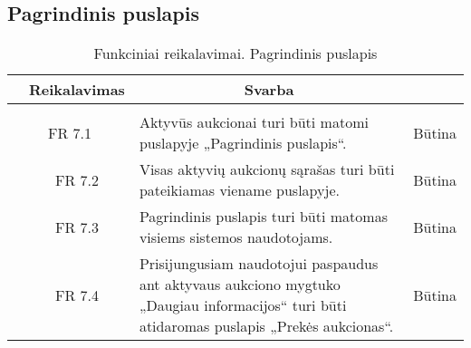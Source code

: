 \documentclass{VUMIFPSkursinis}
\begin{document}
\subsection{Pagrindinis puslapis}
\begin{table}[H]
	\caption{Funkciniai reikalavimai. Pagrindinis puslapis}
	\begin{tabular}{|p{1cm}|p{1cm}|p{}|p{}|}
		\hline 
		\rowcolor{gray!50}
		\multicolumn{2}{|c|}{{\bfseries Kodas}}&
		\multicolumn{1}{c|}{{\bfseries Reikalavimas}}&
		\multicolumn{1}{c|}{{\bfseries Svarba}}\\
		\hline
		\rowcolor{lightgray}
		\multicolumn{4}{|c|}{Pagrindinis puslapis}\\		
		
		\hline
		\multicolumn{2}{|c|}{FR 7.1}&
		{Aktyvūs aukcionai turi būti matomi puslapyje „Pagrindinis puslapis“.
		}&		
		\multicolumn{1}{c|}{Būtina}\\
		\hline
		\multicolumn{1}{|c}{}&
		\multicolumn{1}{c|}{FR 7.2}&
		{Visas aktyvių aukcionų sąrašas turi būti pateikiamas viename puslapyje.
		}&		
		\multicolumn{1}{c|}{Būtina}\\
		\hline	
		\multicolumn{1}{|c}{}&
		\multicolumn{1}{c|}{FR 7.3}&
		{Pagrindinis puslapis turi būti matomas visiems sistemos naudotojams.
		}&
		\multicolumn{1}{c|}{Būtina}\\									
		\hline
		\multicolumn{1}{|c}{}&
		\multicolumn{1}{c|}{FR 7.4}&
		{Prisijungusiam naudotojui paspaudus ant aktyvaus aukciono mygtuko „Daugiau informacijos“ turi būti atidaromas puslapis „Prekės aukcionas“.
		}&
		\multicolumn{1}{c|}{Būtina}\\									
		\hline
	\end{tabular}		
\end{table}
\end{document}
